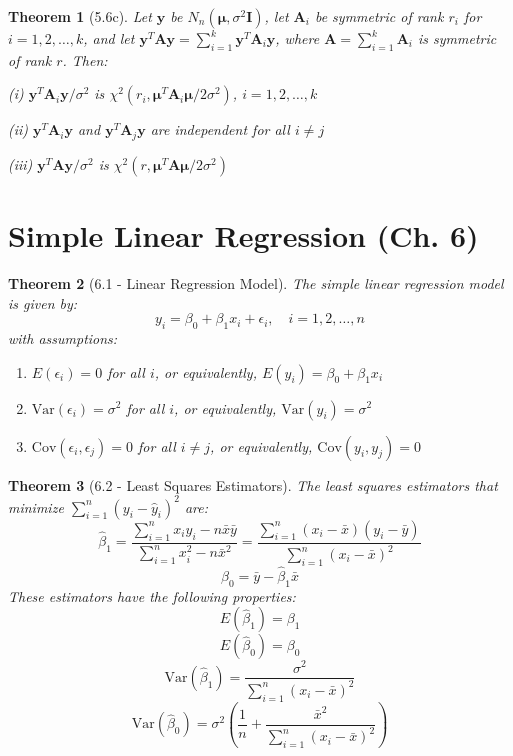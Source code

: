 \documentclass{article}
\newtheorem{theorem}{Theorem}[section]
\begin{document}
\begin{theorem}[5.6c]
Let $\mathbf{y}$ be $N_n(\boldsymbol{\mu},\sigma^2\mathbf{I})$, let $\mathbf{A}_i$ be symmetric of rank $r_i$ for $i = 1,2,\ldots,k$, and let $\mathbf{y}^T\mathbf{A}\mathbf{y} = \sum_{i=1}^k \mathbf{y}^T\mathbf{A}_i\mathbf{y}$, where $\mathbf{A} = \sum_{i=1}^k \mathbf{A}_i$ is symmetric of rank $r$. Then:

(i) $\mathbf{y}^T\mathbf{A}_i\mathbf{y}/\sigma^2$ is $\chi^2(r_i,\boldsymbol{\mu}^T\mathbf{A}_i\boldsymbol{\mu}/2\sigma^2)$, $i = 1,2,\ldots,k$

(ii) $\mathbf{y}^T\mathbf{A}_i\mathbf{y}$ and $\mathbf{y}^T\mathbf{A}_j\mathbf{y}$ are independent for all $i \neq j$

(iii) $\mathbf{y}^T\mathbf{A}\mathbf{y}/\sigma^2$ is $\chi^2(r,\boldsymbol{\mu}^T\mathbf{A}\boldsymbol{\mu}/2\sigma^2)$
\end{theorem}

\section{Simple Linear Regression (Ch. 6)}

\begin{theorem}[6.1 - Linear Regression Model]
The simple linear regression model is given by:
\[y_i = \beta_0 + \beta_1 x_i + \epsilon_i, \quad i = 1, 2, \ldots, n\]
with assumptions:
\begin{enumerate}
\item $E(\epsilon_i) = 0$ for all $i$, or equivalently, $E(y_i) = \beta_0 + \beta_1x_i$
\item $\text{Var}(\epsilon_i) = \sigma^2$ for all $i$, or equivalently, $\text{Var}(y_i) = \sigma^2$
\item $\text{Cov}(\epsilon_i, \epsilon_j) = 0$ for all $i \neq j$, or equivalently, $\text{Cov}(y_i, y_j) = 0$
\end{enumerate}
\end{theorem}

\begin{theorem}[6.2 - Least Squares Estimators]
The least squares estimators that minimize $\sum_{i=1}^n (y_i - \hat{y}_i)^2$ are:
\[\hat{\beta}_1 = \frac{\sum_{i=1}^n x_i y_i - n\bar{x}\bar{y}}{\sum_{i=1}^n x_i^2 - n\bar{x}^2} = \frac{\sum_{i=1}^n (x_i - \bar{x})(y_i - \bar{y})}{\sum_{i=1}^n (x_i - \bar{x})^2}\]
\[\hat{\beta}_0 = \bar{y} - \hat{\beta}_1\bar{x}\]
These estimators have the following properties:
\[E(\hat{\beta}_1) = \beta_1\]
\[E(\hat{\beta}_0) = \beta_0\]
\[\text{Var}(\hat{\beta}_1) = \frac{\sigma^2}{\sum_{i=1}^n (x_i - \bar{x})^2}\]
\[\text{Var}(\hat{\beta}_0) = \sigma^2\left(\frac{1}{n} + \frac{\bar{x}^2}{\sum_{i=1}^n (x_i - \bar{x})^2}\right)\]
\end{theorem}
\end{document}
